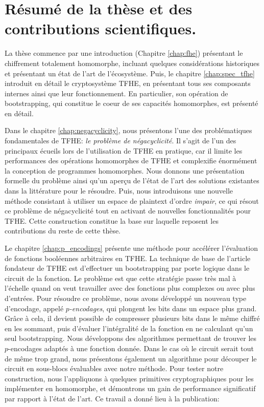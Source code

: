 \section*{Résumé de la thèse et des contributions scientifiques.}

La thèse commence par une introduction (Chapitre \ref{chap:fhe}) présentant le chiffrement totalement homomorphe, incluant quelques considérations historiques et présentant un état de l’art de l'écosystème. Puis, le chapitre \ref{chap:spec_tfhe} introduit en détail le cryptosystème TFHE, en présentant tous ses composants internes ainsi que leur fonctionnement. En particulier, son opération de bootstrapping, qui constitue le coeur de ses capacités homomorphes, est présenté en détail.


Dans le chapitre \ref{chap:negacyclicity}, nous présentons l'une des problématiques fondamentales de TFHE: \textit{le problème de négacyclicité}. Il s'agit de l’un des principaux écueils lors de l'utilisation de TFHE en pratique,  car il limite les performances des opérations homomorphes de TFHE et complexifie énormément la conception de programmes homomorphes. Nous donnons une présentation formelle du problème ainsi qu’un aperçu de l’état de l’art des solutions existantes dans la littérature pour le résoudre. Puis, nous introduisons une nouvelle méthode consistant à utiliser un espace de plaintext d'ordre \textit{impair}, ce qui résout ce problème de négacyclicité tout en activant de nouvelles fonctionnalités pour TFHE. Cette construction constitue la base sur laquelle reposent les contributions du reste de cette thèse.


Le chapitre \ref{chap:p_encodings} présente une méthode pour accélérer l’évaluation de fonctions booléennes arbitraires en TFHE. La technique de base de l'article fondateur de TFHE est d'effectuer un bootstrapping par porte logique dans le circuit de la fonction. Le problème est que cette stratégie passe très mal à l'échelle quand on veut travailler avec des fonctions plus complexes ou avec plus d'entrées. Pour résoudre ce problème, nous avons développé un nouveau type d'encodage, appelé \textit{$p$-encodages}, qui plongent les bits dans un espace plus grand. Grâce à cela, il devient possible de compresser plusieurs bits dans le même chiffré en les sommant, puis d'évaluer l'intégralité de la fonction en ne calculant qu'un seul bootstrapping. Nous développons des algorithmes permettant de trouver les $p$-encodages adaptés à une fonction donnée. Dans le cas où le circuit serait tout de même trop grand, nous présentons également un algorithme pour découper le circuit en sous-blocs évaluables avec notre méthode. Pour tester notre construction, nous l'appliquons à quelques primitives cryptographiques pour les implémenter en homomorphe, et démontrons un gain de performance significatif par rapport à l’état de l’art.
Ce travail a donné lieu à la publication:

